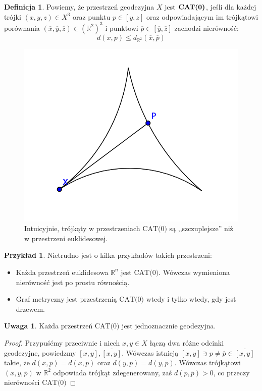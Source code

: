 \documentclass[licencjacka]{pracamgr}
\theoremstyle{definition}
\newtheorem{definition}{Definicja}[section]
\theoremstyle{definition}
\newtheorem{remark}{Uwaga}[section]
\theoremstyle{definition}
\theoremstyle{definition}
\newtheorem{example}{Przykład}[section]
\theoremstyle{definition}
\theoremstyle{plain}
\theoremstyle{plain}
\begin{document}
\begin{definition}
	Powiemy, że przestrzeń geodezyjna $ X $ jest $ \text{\textbf{CAT(0)}} $, jeśli 
	dla każdej trójki $ (x,y,z) \in X^3 $ oraz punktu $ p \in [y,z] $ oraz odpowiadającym 
	im trójkątowi porównania $ (\overline{x}, \overline{y}, \overline{z}) \in 
	\left(\mathbb{R}^2\right)^3 $ i punktowi $ \overline{p} \in [\overline{y}, 
	\overline{z}] $ zachodzi nierówność:
	$$ d(x,p) \leq d_{\mathbb{R}^2}(\overline{x}, \overline{p}) $$
\end{definition} 
\begin{figure}
	\caption{\small{Intuicyjnie, trójkąty w przestrzeniach $ \text{CAT(0)} $ są ,,szczuplejsze''
	niż w przestrzeni euklidesowej.}}
	\centering
	\includegraphics{trojkat_hiperboliczny}
\end{figure}

\begin{example} Nietrudno jest o kilka przykładów takich przestrzeni:
	\begin{itemize}
	\item Każda przestrzeń euklidesowa $ \mathbb{R}^n $ jest $ \text{CAT(0)} $. Wówczas 
	wymieniona nierówność jest po prostu równością.
	\item Graf metryczny jest przestrzenią $ \text{CAT(0)} $ wtedy i tylko wtedy, gdy 
	jest drzewem.
	\end{itemize}
\end{example}

\begin{remark}
	Każda przestrzeń $ \text{CAT(0)} $ jest jednoznacznie geodezyjna.
\end{remark}
\begin{proof}
	Przypuśćmy przeciwnie i niech $ x,y \in X $ łączą dwa różne odcinki geodezyjne, 
	powiedzmy $ [x,y], \overline{[x,y]} $.	Wówczas istnieją $ [x,y] \ni p \neq \overline p 
	\in	\overline{[x,y]}  $ takie, że $ d(x,p) = d(x,\overline{p}) $ oraz $ d(y,p) = 
	d(y, \overline{p}) $. Wówczas trójkątowi $ (x,y,\overline{p}) $ w $ \mathbb{R}^2$ 
	odpowiada trójkąt zdegenerowany, zaś $ d(p,\overline{p}) > 0 $, co przeczy nierówności 
	$ \text{CAT(0)} $
\end{proof}
\end{document}
